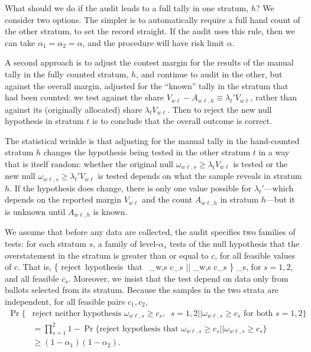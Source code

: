 What should we do if the audit leads to a full tally in one stratum, $h$?
We consider two options.
The simpler is to automatically require a full hand count of the other stratum, 
to set the record straight.
If the audit uses this rule, then we can take $\alpha_1 = \alpha_2 = \alpha$, and the procedure will have
risk limit $\alpha$.

A second approach is to adjust the contest margin for the results of the manual tally in the
fully counted stratum, $h$, and continue to audit in the other, 
but against the overall margin, adjusted for the ``known'' tally in the stratum that had 
been counted: we test against the share $V_{w\ell} - A_{w\ell,h} \equiv \lambda_t' V_{w\ell}$, rather than 
against its (originally allocated) share $\lambda_t V_{w\ell}$.
Then to reject the new null hypothesis in stratum $t$ is to conclude that the overall outcome is correct.

The statistical wrinkle is that adjusting for the manual tally in the hand-counted stratum $h$
changes the hypothesis being tested in the other stratum $t$
in a way that is itself random:
whether the original null $\omega_{w\ell,s} \ge \lambda_t V_{w\ell}$ is tested
or the new null $\omega_{w\ell,s} \ge \lambda_t' V_{w\ell}$ is tested depends on what the 
sample reveals in stratum $h$.
If the hypothesis does change, there is only one value possible for $\lambda_t'$---which
depends on the reported margin $V_{w\ell}$ and the count $A_{w\ell,h}$ in 
stratum $h$---but it is unknown until $A_{w\ell,h}$ is known.

We assume that before any data are collected, the audit specifies two families of tests:
for each stratum $s$, a family of level-$\alpha_s$ tests of the null hypothesis that 
the overstatement in the stratum is greater than or equal to $c$, for all feasible values of $c$.
That is,
\beq
    \Pr \{ \mbox{reject hypothesis that } \omega_{w\ell,s} \ge c_s || \omega_{w\ell,s} \ge c_s \} \le \alpha_s,
\eeq
for $s = 1, 2$, and all feasible $c_s$.
Moreover, we insist that the test depend on data only from ballots selected from its stratum.
Because the samples in the two strata are independent, for all feasible pairs $c_1, c_2$,
\begin{align} \label{eq:stratum_families}
    \Pr\{&\mbox{reject neither hypothesis } \omega_{w\ell,s} \ge c_s, \;\; s=1, 2 ||
       \omega_{w\ell,s} \ge c_s  \mbox{ for both } s=1, 2 \} \nonumber \\ 
       &= \prod_{s=1}^2 1 - \Pr \{ \mbox{reject hypothesis that } \omega_{w\ell,s} \ge c_s || \omega_{w\ell,s} \ge c_s \} \nonumber \\
       & \ge (1-\alpha_1)(1-\alpha_2).
\end{align}

